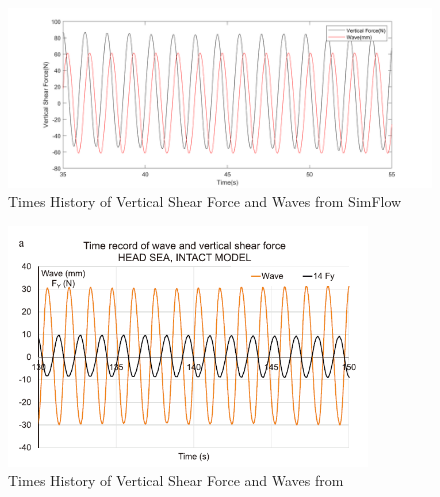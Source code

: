 \documentclass[12pt]{article} %
\begin{document}
\begin{figure}[ht]
    \centering
    \includegraphics[width=1\textwidth]{Myresults.png}
    \caption{Times History of Vertical Shear Force and Waves from SimFlow}
\end{figure}
\begin{figure}[ht]
    \centering
    \includegraphics[width=0.85\textwidth]{ref_results.png}
    \caption{Times History of Vertical Shear Force and Waves from \cite{Begovic2017}}
\end{figure}

\clearpage
\end{document}
